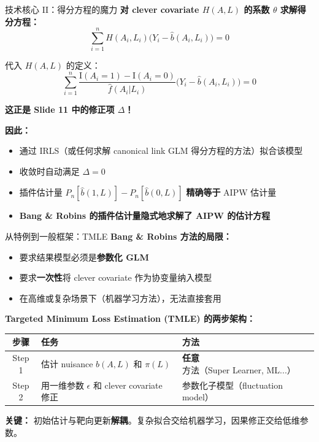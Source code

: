 \documentclass[aspectratio=169,10pt]{beamer}
\begin{document}
	\begin{frame}{技术核心 II：得分方程的魔力}
		\textbf{对 clever covariate $H(A,L)$ 的系数 $\theta$ 求解得分方程：}
		\[
		\sum_{i=1}^n H(A_i, L_i) \big(Y_i - \widehat{b}(A_i, L_i)\big) = 0
		\]
		
		代入 $H(A,L)$ 的定义：
		\[
		\sum_{i=1}^n \frac{\mathrm{I}(A_i=1) - \mathrm{I}(A_i=0)}{\widehat{f}(A_i|L_i)} \big(Y_i - \widehat{b}(A_i, L_i)\big) = 0
		\]
		
		\textbf{这正是 Slide 11 中的修正项 $\Delta$！}
		
		\vspace{0.3cm}
		\textbf{因此：}
		\begin{itemize}
			\item 通过 IRLS（或任何求解 canonical link GLM 得分方程的方法）拟合该模型
			\item 收敛时自动满足 $\Delta = 0$
			\item 插件估计量 $P_n[\widehat{b}(1,L)] - P_n[\widehat{b}(0,L)]$ \textbf{精确等于} AIPW 估计量
			\item \textbf{Bang \& Robins 的插件估计量隐式地求解了 AIPW 的估计方程}
		\end{itemize}
	\end{frame}
	
	\begin{frame}{从特例到一般框架：TMLE}
		\textbf{Bang \& Robins 方法的局限：}
		\begin{itemize}
			\item 要求结果模型必须是\textbf{参数化 GLM}
			\item 要求\textbf{一次性}将 clever covariate 作为协变量纳入模型
			\item 在高维或复杂场景下（机器学习方法），无法直接套用
		\end{itemize}
		
		\textbf{Targeted Minimum Loss Estimation (TMLE) 的两步架构：}
		
		\begin{center}
			\begin{tabular}{cll}
				\toprule
				\textbf{步骤} & \textbf{任务} & \textbf{方法} \\
				\midrule
				Step 1 & 估计 nuisance $b(A,L)$ 和 $\pi(L)$ & \textbf{任意}方法（Super Learner, ML...） \\
				Step 2 & 用一维参数 $\epsilon$ 和 clever covariate 修正 & 参数化子模型（fluctuation model） \\
				\bottomrule
			\end{tabular}
		\end{center}
		
		\textbf{关键：} 初始估计与靶向更新\textbf{解耦}。复杂拟合交给机器学习，因果修正交给低维参数。
	\end{frame}
	
\end{document}
